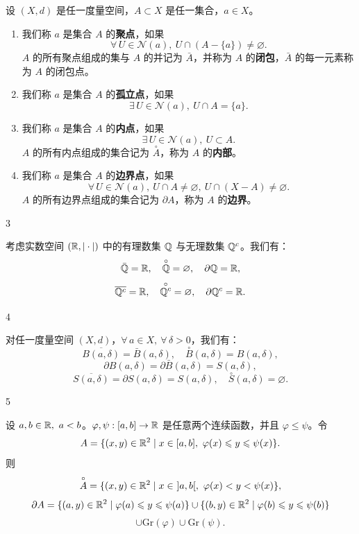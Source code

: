 \begin{mydef*}{}

设 $(X,d)$ 是任一度量空间，$A\subset X$ 是任一集合，$a\in X$。

\begin{enumerate}[label=\arabic{enumi})]
\item 我们称 $a$ 是集合 $A$ 的\textbf{聚点}，如果
\[\forall\,U\in\mathscr{N}(a),\ U\cap(A-\{a\})\neq\varnothing.\]
$A$ 的所有聚点组成的集与 $A$ 的并记为 $\bar A$，并称为 $A$ 的\textbf{闭包}，$\bar A$ 的每一元素称为 $A$ 的闭包点。
\item 我们称 $a$ 是集合 $A$ 的\textbf{孤立点}，如果
\[\exists\,U\in\mathscr{N}(a),\ U\cap A=\{a\}.\]
\item 我们称 $a$ 是集合 $A$ 的\textbf{内点}，如果
\[\exists\,U\in\mathscr{N}(a),\ U\subset A.\]
$A$ 的所有内点组成的集合记为 $\overset{\circ}{A}$，称为 $A$ 的\textbf{内部}。
\item 我们称 $a$ 是集合 $A$ 的\textbf{边界点}，如果
\[\forall\,U\in\mathscr{N}(a),\ U\cap A\neq\varnothing,\ U\cap(X-A)\neq\varnothing.\]
$A$ 的所有边界点组成的集合记为 $\partial A$，称为 $A$ 的\textbf{边界}。
\end{enumerate}

\end{mydef*}

\begin{sourceexample}{3}

考虑实数空间 $(\mathbb{R},|\cdot|)$ 中的有理数集 $\mathbb{Q}$ 与无理数集 $\mathbb{Q}^c$。我们有：
\[\bar{\mathbb{Q}}=\mathbb{R},\quad\overset{\circ}{\mathbb{Q}}=\varnothing,\quad\partial\mathbb{Q}=\mathbb{R},\]
\[\overline{\mathbb{Q}^c}=\mathbb{R},\quad\overset{\circ}{\mathbb{Q}^c}=\varnothing,\quad\partial\mathbb{Q}^c=\mathbb{R}.\]

\end{sourceexample}

\begin{sourceexample}{4}

对任一度量空间 $(X,d)$，$\forall\,a\in X,\ \forall\,\delta>0$，我们有：
\[\overline{B(a,\delta)}=\bar B(a,\delta),\quad\overset{\circ}{B}(a,\delta)=B(a,\delta),\]
\[\partial B(a,\delta)=\partial\bar B(a,\delta)=S(a,\delta),\]
\[\overline{S(a,\delta)}=\partial S(a,\delta)=S(a,\delta),\quad\overset{\circ}{S}(a,\delta)=\varnothing.\]

\end{sourceexample}

\begin{sourceexample}{5}

设 $a,b\in\mathbb{R},\ a<b$。$\varphi,\psi:[a,b]\to\mathbb{R}$ 是任意两个连续函数，并且 $\varphi\leqslant\psi$。令
\[A=\{(x,y)\in\R^2\mid x\in[a,b],\ \varphi(x)\leqslant y\leqslant\psi(x)\}.\]
则
\[\overset{\circ}{A}=\{(x,y)\in\R^2\mid x\in\ ]a,b[,\ \varphi(x)<y<\psi(x)\},\]
\[\partial A=\{(a,y)\in\mathbb{R}^2\mid\varphi(a)\leqslant y\leqslant\psi(a)\}\cup\{(b,y)\in\mathbb{R}^2\mid\varphi(b)\leqslant y\leqslant\psi(b)\}\]
\[\cup\mathrm{Gr}(\varphi)\cup\mathrm{Gr}(\psi).\]

\end{sourceexample}


